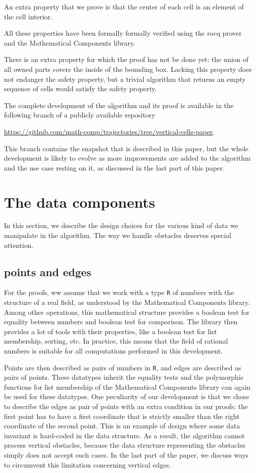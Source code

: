 \documentclass[a4paper, USenglish, cleveref, autoref, thm-restate]{lipics-v2021}
\begin{document}
An extra property that we prove is that the center of each cell is an
element of the cell interior.

All these properties have been formally formally verified using the
rocq prover and the {\sc Mathematical Components} library.

There is an extra property for which the proof has not be done yet:
the union of all owned parts covers the inside of the bounding box.  Lacking
this property does not endanger the safety property, but a trivial algorithm
that returns an empty sequence of cells would satisfy the safety property.

The complete development of the algorithm and its proof is available
in the following branch of a publicly available repository
\begin{center}
\url{https://github.com/math-comp/trajectories/tree/vertical-cells-paper}.
\end{center}
This branch contains the snapshot that is described in this paper, but
the whole development is likely to evolve as more improvements are
added to the algorithm and the use case resting on it, as discussed in the
last part of this paper.

\section{The data components}
In this section, we describe the design choices for the various kind
of data we manipulate in the algorithm.  The way we handle obstacles
deserves special attention.
\subsection{points and edges}

For the proofs, ww assume that we work with a type {\tt R} of numbers
with the structure of a real field, as understood by the
{\sc Mathematical Components} library.  Among other operations, this
mathematical structure provides a boolean test for equality between
numbers and boolean test for comparison.  The library then provides a
lot of tools with their properties, like a boolean test for list
membership, sorting, etc.  In practice, this means that
the field of rational numbers is suitable for all computations
performed in this development.

Points are then described as pairs of numbers in {\tt R}, and edges
are described as pairs of points.  These datatypes inherit the
equality tests and the polymorphic functions for list membership of
the {\sc Mathematical Components} library can again be used for these
datatypes.  One peculiarity of our development
is that we chose to describe the edges as pair of points with an extra
condition in our proofs: the first point has to have a first
coordinate that is strictly smaller than the right coordinate of the
second point.  This is an example of design where some data invariant
is hard-coded in the data structure.  As a result, the algorithm
cannot process vertical obstacles, because the data structure
representing the obstacles simply does not accept such cases.  In the
last part of the paper, we discuss ways to circumvent this limitation
concerning vertical edges.
\end{document}
